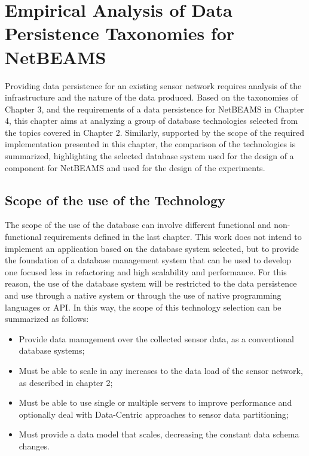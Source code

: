 

\chapter{Empirical Analysis of Data Persistence Taxonomies for NetBEAMS}

Providing data persistence for an existing sensor network requires analysis of
the infrastructure and the nature of the data produced. Based on the
taxonomies of Chapter 3, and the requirements of a data persistence for
NetBEAMS in Chapter 4, this chapter aims at analyzing a group of database
technologies selected from the topics covered in Chapter 2.
Similarly, supported by the scope of the required implementation presented in
this chapter, the comparison of the technologies is summarized, highlighting
the selected database system used for the design of a component for NetBEAMS
and used for the design of the experiments.

\section{Scope of the use of the Technology}

The scope of the use of the database can involve different functional and
non-functional requirements defined in the last chapter. This work does not
intend to implement an application based on the database system selected, but
to provide the foundation of a database management system that can be used to
develop one focused less in refactoring and high scalability and performance.
For this reason, the use of the database system will be restricted to the data
persistence and use through a native system or through the use of native
programming languages or API. In this way, the scope of this technology
selection can be summarized as follows:

\begin{itemize}
  \item Provide data management over the collected sensor data, as a
  conventional database systems;
  \item Must be able to scale in any increases to the data load of
  the sensor network, as described in chapter 2;
  \item  Must be able to use single or multiple servers to improve performance
  and optionally deal with Data-Centric approaches to sensor data partitioning;
  \item Must provide a data model that scales, decreasing the constant data
  schema changes.
\end{itemize}

